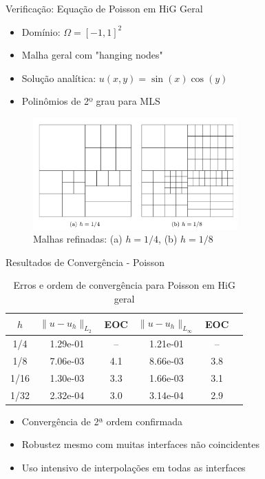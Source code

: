 \documentclass[../main/main.tex]{subfiles}
\begin{document}
\begin{frame}{Verificação: Equação de Poisson em HiG Geral}
\begin{itemize}
\item Domínio: $\Omega = [-1, 1]^2$
\item Malha geral com "hanging nodes"
\item Solução analítica: $u(x, y) = \sin(x)\cos(y)$
\item Polinômios de 2º grau para MLS
\end{itemize}

\begin{figure}
\centering
\includegraphics[width=0.7\textwidth]{imgs/figura4.png}
\caption{Malhas refinadas: (a) $h=1/4$, (b) $h=1/8$}
\end{figure}
\end{frame}

\begin{frame}{Resultados de Convergência - Poisson}
\begin{table}
\centering
\caption{Erros e ordem de convergência para Poisson em HiG geral}
\begin{tabular}{cccccc}
\toprule
$h$ & $\|u-u_h\|_{L_2}$ & EOC & $\|u-u_h\|_{L_\infty}$ & EOC \\
\midrule
1/4 & 1.29e-01 & -- & 1.21e-01 & -- \\
1/8 & 7.06e-03 & 4.1 & 8.66e-03 & 3.8 \\
1/16 & 1.30e-03 & 3.3 & 1.66e-03 & 3.1 \\
1/32 & 2.32e-04 & 3.0 & 3.14e-04 & 2.9 \\
\bottomrule
\end{tabular}
\end{table}

\begin{itemize}
\item Convergência de 2ª ordem confirmada
\item Robustez mesmo com muitas interfaces não coincidentes
\item Uso intensivo de interpolações em todas as interfaces
\end{itemize}
\end{frame}
\end{document}

